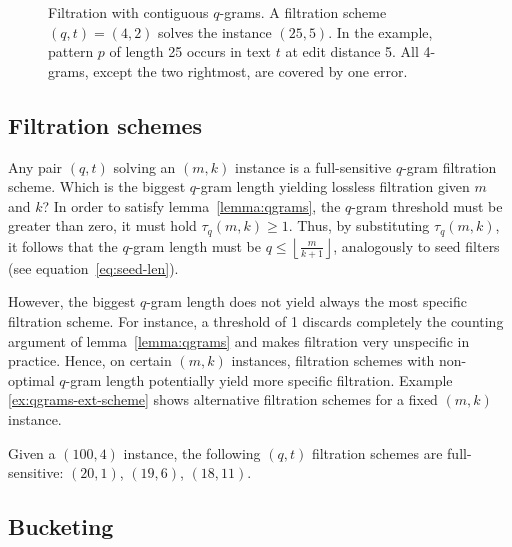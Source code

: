 \begin{figure}[h]
\begin{center}
\caption[Filtration with contiguous $q$-grams]{Filtration with contiguous $q$-grams. A filtration scheme $(q,t) = (4,2)$ solves the instance $(25,5)$. In the example, pattern $p$ of length 25 occurs in text $t$ at edit distance 5. All 4-grams, except the two rightmost, are covered by one error.}
\label{fig:qgrams-ext}

\end{center}
\end{figure}

\subsection{Filtration schemes}

Any pair $(q,t)$ solving an $(m,k)$ instance is a full-sensitive $q$-gram filtration scheme.
Which is the biggest $q$-gram length yielding lossless filtration given $m$ and $k$?
In order to satisfy lemma~\ref{lemma:qgrams}, the $q$-gram threshold must be greater than zero, \ie it must hold $\tau_q(m,k) \geq 1$.
Thus, by substituting $\tau_q(m,k)$, it follows that the $q$-gram length must be $q \leq \left \lfloor \frac{m}{k+1} \right \rfloor$, analogously to seed filters (see equation~\ref{eq:seed-len}).

However, the biggest $q$-gram length does not yield always the most specific filtration scheme.
For instance, a threshold of 1 discards completely the counting argument of lemma~\ref{lemma:qgrams} and makes filtration very unspecific in practice.
Hence, on certain $(m,k)$ instances, filtration schemes with non-optimal $q$-gram length potentially yield more specific filtration.
Example \ref{ex:qgrams-ext-scheme} shows alternative filtration schemes for a fixed $(m,k)$ instance.

\begin{example}
\label{ex:qgrams-ext-scheme}
Given a $(100,4)$ instance, the following $(q,t)$ filtration schemes are full-sensitive:
$(20,1)$, $(19,6)$, $(18,11)$.
\end{example}

\subsection{Bucketing}

